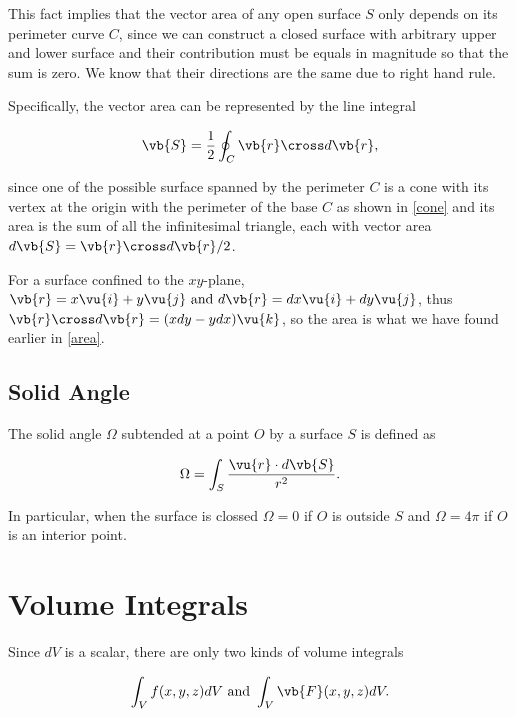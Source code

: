 \documentclass[english,a4paper,12pt]{report}
\begin{document}
This fact implies that the vector area of any open surface \(S\) only depends on its perimeter curve \(C\), since we can construct a closed surface with arbitrary upper and lower surface and their contribution must be equals in magnitude so that the sum is zero. We know that their directions are the same due to right hand rule. 

Specifically, the vector area can be represented by the line integral 

\begin{equation}
	\vb{S} = \frac{1}{2} \oint_{C} \vb{r} \cross d\vb{r}, 
\end{equation}

since one of the possible surface spanned by the perimeter \(C\) is a cone with its vertex at the origin with the perimeter of the base \(C\) as shown in \cref{cone} and its area is the sum of all the infinitesimal triangle, each with vector area \( d\vb{S} =  \vb{r} \cross d\vb{r} /2  \).  


For a surface confined to the \(xy\)-plane, \(\vb{r} = x \vu{i} + y \vu{j} \text { and } d\vb{r} = dx \vu{i} + dy \vu{j}\), thus \(\vb{r} \cross d\vb{r} = (xdy-ydx)\vu{k}\), so the area is what we have found earlier in \cref{area}.   


\subsection{Solid Angle}

The solid angle \(\Omega \) subtended at a point \(O\) by a surface \(S\) is defined as 

\begin{equation}
	\Omega = \int_{S}^{} \frac{\vu{r} \cdot d\vb{S} }{r^2} . 
\end{equation}

In particular, when the surface is clossed \(\Omega = 0\) if \(O\) is outside \(S\) and \(\Omega = 4\pi \) if \(O\) is an interior point.  

\section{Volume Integrals}

Since \(dV\) is a scalar, there are only two kinds of volume integrals

\begin{equation}
	\int_{V}^{} f(x,y,z)dV \text { and } \int_{V}^{} \vb{F} (x,y,z) dV.    
\end{equation}
\end{document}
